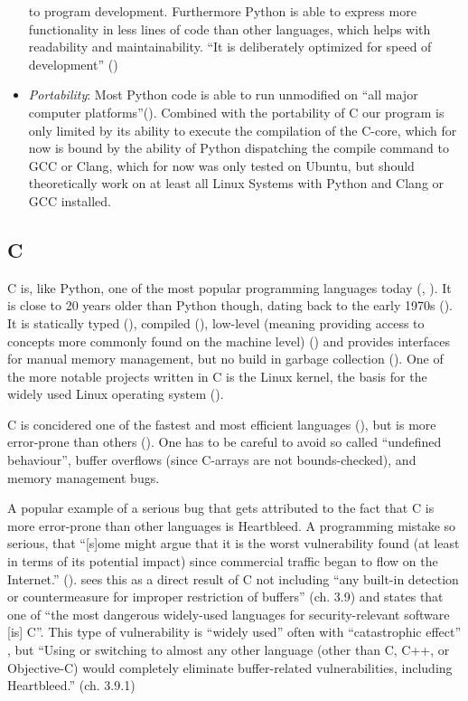 \begin{itemize}
  to program development. Furthermore Python is able to express more
  functionality in less lines of code than other languages, which helps
  with readability and maintainability. ``It is deliberately optimized
  for speed of development'' (\cite[p. 5]{learningpython})
\item
  \emph{Portability}: Most Python code is able to run unmodified on
  ``all major computer platforms''(\cite[p. 4, 17-18]{learningpython}). Combined
  with the portability of C our program is only limited by its ability
  to execute the compilation of the C-core, which for now is bound by
  the ability of Python dispatching the compile command to GCC or Clang,
  which for now was only tested on Ubuntu, but should theoretically work
  on at least all Linux Systems with Python and Clang or GCC installed.
\end{itemize}

\hypertarget{c}{%
\subsection{C}\label{c}}

C is, like Python, one of the most popular programming languages today
(\cite{instack}, \cite{octgit}). It is close to 20 years older than Python though,
dating back to the early 1970s (\cite[p. 2]{cmodern}). It is statically typed
(\cite[p. 40]{modernc}), compiled (\cite[p. 2]{cmodern}), low-level (meaning providing
access to concepts more commonly found on the machine level) (\cite[p. 4]{cmodern}) and provides interfaces for manual memory management, but no build in
garbage collection (\cite[p. 55]{cpointers}). One of the more notable projects
written in C is the Linux kernel, the basis for the widely used Linux
operating system (\cite{kernel}).

C is concidered one of the fastest and most efficient languages
(\cite{benchmarkgame}), but is
more error-prone than others (\cite[p. 5]{modernc}). One has to be careful to avoid
so called ``undefined behaviour'', buffer overflows (since C-arrays are
not bounds-checked), and memory management bugs.

A popular example of a serious bug that gets attributed to the fact that
C is more error-prone than other languages is Heartbleed. A programming
mistake so serious, that ``[s]ome might argue that it is the worst
vulnerability found (at least in terms of its potential impact) since
commercial traffic began to flow on the Internet.'' (\cite{forbes}).
\cite{wheeler} sees this as a
direct result of C not including ``any built-in detection or
countermeasure for improper restriction of buffers'' (ch. 3.9) and
states that one of ``the most dangerous widely-used languages for
security-relevant software [is] C''. This type of vulnerability is
``widely used'' often with ``catastrophic effect'' , but ``Using or
switching to almost any other language (other than C, C++, or
Objective-C) would completely eliminate buffer-related vulnerabilities,
including Heartbleed.'' (ch. 3.9.1)

